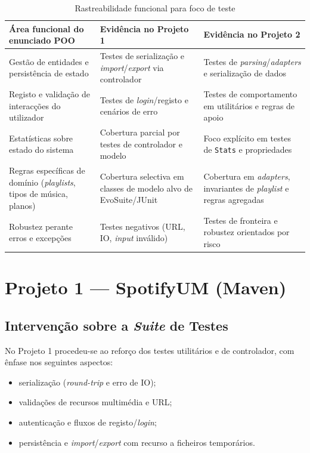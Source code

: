 \documentclass{article}
\begin{document}
\begin{table}[H]
\centering
\begin{tabular}{p{}p{}p{}}
\toprule
Área funcional do enunciado POO & Evidência no Projeto 1 & Evidência no Projeto 2 \\
\midrule
Gestão de entidades e persistência de estado & Testes de serialização e \emph{import}/\emph{export} via controlador & Testes de \emph{parsing}/\emph{adapters} e serialização de dados \\
Registo e validação de interacções do utilizador & Testes de \emph{login}/registo e cenários de erro & Testes de comportamento em utilitários e regras de apoio \\
Estatísticas sobre estado do sistema & Cobertura parcial por testes de controlador e modelo & Foco explícito em testes de \texttt{Stats} e propriedades \\
Regras específicas de domínio (\emph{playlists}, tipos de música, planos) & Cobertura selectiva em classes de modelo alvo de EvoSuite/JUnit & Cobertura em \emph{adapters}, invariantes de \emph{playlist} e regras agregadas \\
Robustez perante erros e excepções & Testes negativos (URL, IO, \emph{input} inválido) & Testes de fronteira e robustez orientados por risco \\
\bottomrule
\end{tabular}
\caption{Rastreabilidade funcional para foco de teste}
\end{table}

\section{Projeto 1 --- SpotifyUM (Maven)}

\subsection{Intervenção sobre a \emph{Suite} de Testes}

No Projeto 1 procedeu-se ao reforço dos testes utilitários e de controlador, com ênfase nos seguintes aspectos:
\begin{itemize}
    \item serialização (\emph{round-trip} e erro de IO);
    \item validações de recursos multimédia e URL;
    \item autenticação e fluxos de registo/\emph{login};
    \item persistência e \emph{import}/\emph{export} com recurso a ficheiros temporários.
\end{itemize}
\end{document}
